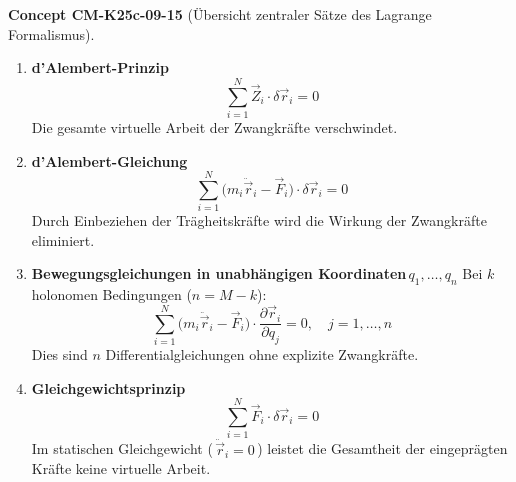 \documentclass[10pt, letterpaper]{article}
\newcommand{\CustomHeading}[3]{%
  \par\medskip\noindent%
  \textbf{#1 #2} \textnormal{(#3)}.\enskip%
}
\newenvironment{CONC}[2]{\begin{unitbox}\CustomHeading{Concept}{#1}{#2}}{\end{unitbox}}
\begin{document}
\begin{CONC}{CM-K25c-09-15}{Übersicht zentraler Sätze des Lagrange Formalismus}
\begin{enumerate}
  \item \textbf{d’Alembert-Prinzip}  
        \[
          \boxed{\;
            \sum_{i=1}^{N} \vec Z_i \!\cdot\! \delta\vec r_i = 0
          \;}
        \]
        Die gesamte virtuelle Arbeit der Zwangkräfte verschwindet.

  \item \textbf{d’Alembert-Gleichung}  
        \[
          \boxed{\;
            \sum_{i=1}^{N}
              \bigl(m_i\ddot{\vec r}_i - \vec F_i\bigr)
              \!\cdot\! \delta\vec r_i = 0
          \;}
        \]
        Durch Einbeziehen der Trägheitskräfte wird die Wirkung der
        Zwangkräfte eliminiert.

  \item \textbf{Bewegungsgleichungen in unabhängigen
        Koordinaten\,$q_1,\dots,q_n$}  
        Bei $k$ holonomen Bedingungen ($n=M-k$):
        \[
          \boxed{\;
            \sum_{i=1}^{N}
              \bigl(m_i\ddot{\vec r}_i - \vec F_i\bigr)
              \!\cdot\!
              \frac{\partial\vec r_i}{\partial q_j}
            = 0,
            \quad j=1,\dots,n
          \;}
        \]
        Dies sind $n$ Differentialgleichungen ohne explizite
        Zwangkräfte.

  \item \textbf{Gleichgewichtsprinzip}  
        \[
          \boxed{\;
            \sum_{i=1}^{N} \vec F_i \!\cdot\! \delta\vec r_i = 0
          \;}
        \]
        Im statischen Gleichgewicht (\,${\ddot{\vec r}}_i=0$\,) leistet
        die Gesamtheit der eingeprägten Kräfte keine virtuelle Arbeit.
\end{enumerate}
\end{CONC}
\end{document}
